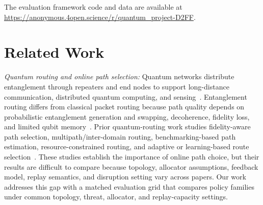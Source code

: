 \documentclass[10pt,journal]{IEEEtran}
\newcommand{\smallTitle}[1]{\vspace{1mm}\noindent\textit{#1:}}
\newcommand{\dan}[1]{\textcolor{blue}{\textit{[Dan: #1]}}}
\begin{document}
The evaluation framework code and data are available at \url{https://anonymous.4open.science/r/quantum_project-D2FF}.

% 
\section{Related Work}
\label{sec:RelatedWork}
\smallTitle{Quantum routing and online path selection}
Quantum networks distribute entanglement through repeaters and end nodes to support long-distance communication, distributed quantum computing, and sensing~\cite{wehner2018quantum,kimble2008quantum}. Entanglement routing differs from classical packet routing because path quality depends on probabilistic entanglement generation and swapping, decoherence, fidelity loss, and limited qubit memory~\cite{briegel1998quantum,dahlberg2021netsquid,bennett1993teleporting,zukowski1993event}. Prior quantum-routing work studies fidelity-aware path selection, multipath/inter-domain routing, benchmarking-based path estimation, resource-constrained routing, and adaptive or learning-based route selection~\cite{wang2025learning,li2025multipath,liu2024qbgp,wang2024adaptive,chaudhary2023quantum,jallowkhan2025adaptive,clayton2024quarc,cicconetti2024scalable,kumar2024routing,leone2021costvector}. These studies establish the importance of online path choice, but their results are difficult to compare because topology, allocator assumptions, feedback model, replay semantics, and disruption setting vary across papers. Our work addresses this gap with a matched evaluation grid that compares policy families under common topology, threat, allocator, and replay-capacity settings.
\end{document}

